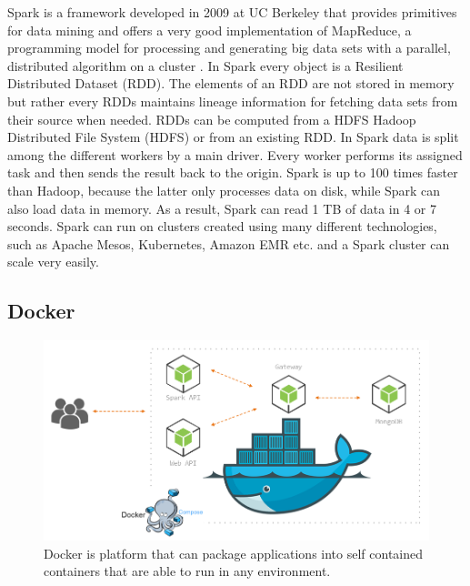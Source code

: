 Spark is a framework developed in 2009 at UC Berkeley \cite{spark} that provides primitives for data mining and offers a very good implementation of MapReduce, a programming model for processing and generating big data sets with a parallel, distributed algorithm on a cluster \cite{mapreduce}. In Spark every object is a Resilient Distributed Dataset (RDD). The elements of an RDD are not stored in memory but rather every RDDs maintains lineage information for fetching data sets from their source when needed. RDDs can be computed from a HDFS Hadoop Distributed File System (HDFS) or from an existing RDD. In Spark data is split among the different workers by a main driver. Every worker performs its assigned task and then sends the result back to the origin. Spark is up to 100 times faster than Hadoop, because the latter only processes data on disk, while Spark can also load data in memory. As a result, Spark can read 1 TB of data in 4 or 7 seconds. Spark can run on clusters created using many different technologies, such as Apache Mesos, Kubernetes, Amazon EMR etc. and a Spark cluster can scale very easily.

\subsection{Docker}

\begin{figure}[H]
	\centering
	\includegraphics[scale=0.4]{img/docker.png}
	\caption{Docker is platform that can package applications into self contained containers that are able to run in any environment.}
	\label{Literature Review:Docker}
\end{figure}

